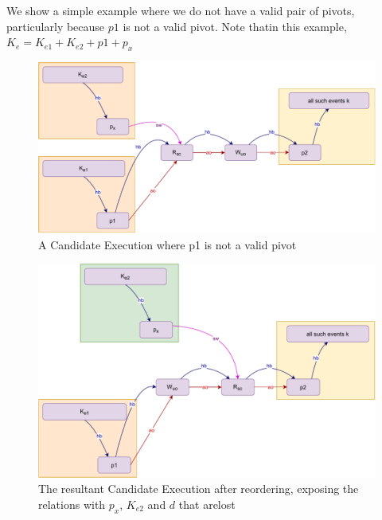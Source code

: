     We show a simple example where we do not have a valid pair of pivots, particularly because $p1$ is not a valid pivot. Note thatin this example, $K_e = K_{e1} + K_{e2} + p1 + p_x$
    \begin{figure}[H]
        \centering
        \includegraphics[scale=0.7]{Q1(e).pdf}
        \caption{A Candidate Execution where p1 is not a valid pivot}
        \label{fig:my_label}
    \end{figure}
    
    \begin{figure}[H]
        \centering
        \includegraphics[scale=0.7]{Q1(f).pdf}
        \caption{The resultant Candidate Execution after reordering, exposing the relations with $p_x$, $K_{e2}$ and $d$ that arelost}
        \label{fig:my_label}
    \end{figure}
        
